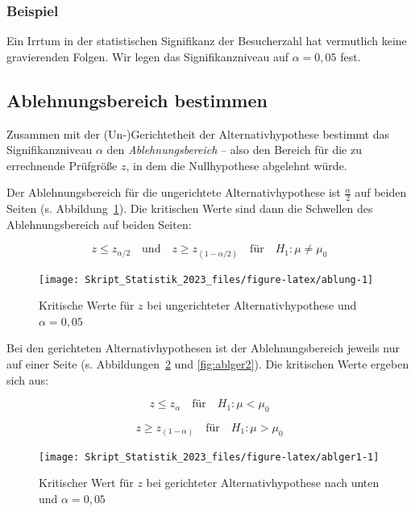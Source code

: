 \documentclass[
  11pt,
  ngerman,
  a4paper,
]{report}
\begin{document}
\hypertarget{beispiel-2}{%
\subsubsection{Beispiel}\label{beispiel-2}}

Ein Irrtum in der statistischen Signifikanz der Besucherzahl hat vermutlich keine gravierenden Folgen. Wir legen das Signifikanzniveau auf \(\alpha=0{,}05\) fest.

\hypertarget{ablehnungsbereich-bestimmen}{%
\subsection{Ablehnungsbereich bestimmen}\label{ablehnungsbereich-bestimmen}}

Zusammen mit der (Un-)Gerichtetheit der Alternativhypothese bestimmt das Signifikanzniveau \(\alpha\) den \emph{Ablehnungsbereich} -- also den Bereich für die zu errechnende Prüfgröße \(z\), in dem die Nullhypothese abgelehnt würde.

Der Ablehnungsbereich für die ungerichtete Alternativhypothese ist \(\frac{\alpha}{2}\) auf beiden Seiten (s. Abbildung~\ref{fig:ablung}). Die kritischen Werte sind dann die Schwellen des Ablehnungsbereich auf beiden Seiten:

\[
z \leq z_{\alpha/2} \quad \textrm{und} \quad z \geq z_{(1-\alpha/2)} \quad \textrm{für} \quad H_1: \mu \neq \mu_0
\label{eq:zkritneq}
\]

\begin{figure}[!h]

{\centering \texttt{[image: Skript\_Statistik\_2023\_files/figure-latex/ablung-1]} 

}

\caption{Kritische Werte für $z$ bei ungerichteter Alternativhypothese und $\alpha=0{,}05$}\label{fig:ablung}
\end{figure}

Bei den gerichteten Alternativhypothesen ist der Ablehnungsbereich jeweils nur auf einer Seite (s. Abbildungen~\ref{fig:ablger1} und \ref{fig:ablger2}). Die kritischen Werte ergeben sich aus:

\[
z \leq z_{\alpha} \quad \textrm{für} \quad H_1: \mu < \mu_0
\label{eq:zkritless}
\]

\[
z \geq z_{(1-\alpha)} \quad \textrm{für} \quad H_1: \mu > \mu_0
\label{eq:zkritgreat}
\]

\begin{figure}[!h]

{\centering \texttt{[image: Skript\_Statistik\_2023\_files/figure-latex/ablger1-1]} 

}

\caption{Kritischer Wert für $z$ bei gerichteter Alternativhypothese nach unten und $\alpha=0{,}05$}\label{fig:ablger1}
\end{figure}
\end{document}
